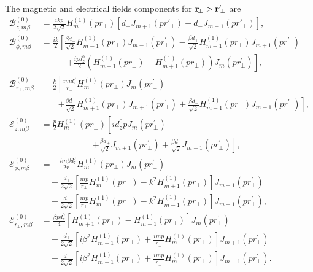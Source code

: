 \documentclass[preprint,aps,pra,onecolumn]{revtex4-1} %
\begin{document}
The magnetic and electrical fields components for $ \mathbf{r}\!_\perp>\mathbf{r}'\!_\perp $ are 
\begin{align}
\mathcal{B}_{z,m\beta}^{(0)} &= \frac{ikp}{2\sqrt{2}}H^{(1)}_m(pr\!_\perp)\left[ d_{+} J_{m+1}(pr'\!\!_\perp) \!-\! d_- J_{m-1}(pr'\!_\perp) \right],\\
\mathcal{B}_{\phi,m\beta}^{(0)} &= \frac{ik}{2}\left[ \frac{\beta d_{-}}{\sqrt{2}} H^{(1)}_{m-1}\left( pr\!_\perp \right)J_{m-1}\left( {pr\!_\perp^{\prime} }\right) -\frac{\beta d_+}{\sqrt{2}} H^{(1)}_{m+1}\left( pr\!_\perp \right)J_{m+1}\left( {pr\!_\perp^{\prime} }\right)\right. \nonumber\\ 
&\qquad\quad \left. + \frac{ipd^0_z}{2}\left(H^{(1)}_{m-1}(pr\!_\perp)-H^{(1)}_{m+1}(pr\!_\perp) \right)J_m(pr\!_\perp^{\prime}) \right],\\
\mathcal{B}_{r\!_\perp, m\beta}^{(0)} &= \frac{k}{2}\left[\frac{i m d^0_z}{r\!_\perp} H^{(1)}_m\left( pr\!_\perp \right) J_m\left( {pr\!_\perp^{\prime} }\right) \right. \nonumber\\
&\qquad \left. +\frac{\beta d_+}{\sqrt{2}} H^{(1)}_{m\!+\!1}(pr\!_\perp) J_{m\!+\! 1}(pr\!_\perp^{\prime}) \!+\! \frac{\beta d_-}{\sqrt{2}} H^{(1)}_{m\!-\! 1}(pr\!_\perp) J_{m\!-\!1}(pr\!_\perp^{\prime})   \right],\\
\mathcal{E}_{z,m\beta}^{(0)} 
&= \frac{p}{2}H^{(1)}_{m}\left( pr\!_\perp \right)\left[  id^0_z p J_m\left( {pr\!_\perp^{\prime} }\right) \phantom{\frac{d^0_z}{\sqrt{2}}} \right. \nonumber\\
&\qquad\qquad\qquad \left. + \frac{\beta d_{+}}{\sqrt{2}} J_{m+1}\left( {pr\!_\perp^{\prime} }\right) +\frac{\beta d_-}{\sqrt{2}} J_{m-1}\left( {pr\!_\perp^{\prime} }\right) \right], \\
\mathcal{E}_{\phi,m\beta}^{(0)} 
&= -\frac{im\beta d^0_z}{2r\!_\perp} H^{(1)}_{m}\left( pr\!_\perp \right) J_m\left( {pr\!_\perp^{\prime} }\right) \nonumber\\
&\quad+\frac{d_+}{2\sqrt{2}} \left[ \frac{mp}{r\!_\perp}H^{(1)}_{m}\left( pr\!_\perp \right)-k^2 H^{(1)}_{m+1}\left( pr\!_\perp \right)\right] J_{m+1}\left( {pr\!_\perp^{\prime} }\right) \nonumber\\
&\quad+ \frac{d_-}{2\sqrt{2}}\left[\frac{mp}{r\!_\perp}H^{(1)}_m\!\left( pr_\perp \right)-k^2 H^{(1)}_{m-1}\!\left( pr_\perp \right) \right] J_{m-1}\!\left( {pr\!_\perp^{\prime} }\right),\\
\mathcal{E}_{r\!_\perp,m\beta}^{(0)} 
&= \frac{\beta pd^0_z}{4}\left[ H^{(1)}_{m+1}\!\left( pr\!_\perp \right)-H^{(1)}_{m-1}\!\left( pr_\perp \right)\right] J_m\left( {pr\!_\perp^{\prime} }\right)\nonumber\\ 
&\quad -\frac{d_+}{2\sqrt{2}}\left[ i\beta^2H^{(1)}_{m+1}\!\left( pr_\perp \right) +\frac{imp}{r\!_\perp}H^{(1)}_m\!\left( pr_\perp \right)\right] J_{m+1}\!\left( {pr\!_\perp^{\prime} }\right)\nonumber\\
&\quad + \frac{d_-}{2\sqrt{2}}\left[ i\beta^2H^{(1)}_{m-1}\!\left( pr_\perp \right) +\frac{imp}{r\!_\perp}H^{(1)}_m\!\left( pr_\perp \right)\right] J_{m-1}\!\left( {pr\!_\perp^{\prime} }\right).
\end{align}
\end{document}
